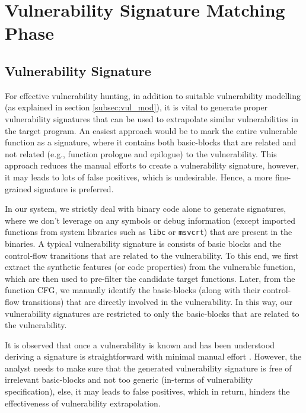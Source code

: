 \section{Vulnerability Signature Matching Phase}\label{sec:pre-proc}


\subsection{Vulnerability Signature}

For effective vulnerability hunting, in addition to suitable vulnerability modelling (as explained in section \ref{subsec:vul_mod}), it is vital to generate proper vulnerability signatures that can be used to extrapolate similar vulnerabilities in the target program. An easiest approach would be to mark the entire vulnerable function as a signature, where it contains both basic-blocks that are related and not related (e.g., function prologue and epilogue) to the vulnerability. This approach reduces the manual efforts to create a vulnerability signature, however, it may leads to lots of false positives, which is undesirable. Hence, a more fine-grained signature is preferred.

In our system, we strictly deal with binary code alone to generate signatures, where we don't leverage on any symbols or debug information (except imported functions from system libraries such as \texttt{libc} or \texttt{msvcrt}) that are present in the binaries. A typical vulnerability signature is consists of basic blocks and the control-flow transitions that are related to the vulnerability. To this end, we first extract the synthetic features (or code properties) from the vulnerable function, which are then used to pre-filter the candidate target functions. Later, from the function CFG, we manually identify the basic-blocks (along with their control-flow transitions) that are directly involved in the vulnerability. In this way, our vulnerability signatures are restricted to only the basic-blocks that are related to the vulnerability. 

It is observed that once a vulnerability is known and has been understood deriving a signature is straightforward with minimal manual effort \cite{ruttenberg2014identifying}. However, the analyst needs to make sure that the generated vulnerability signature is free of irrelevant basic-blocks and not too generic (in-terms of vulnerability specification), else, it may leads to false positives, which in return, hinders the effectiveness of vulnerability extrapolation.  

